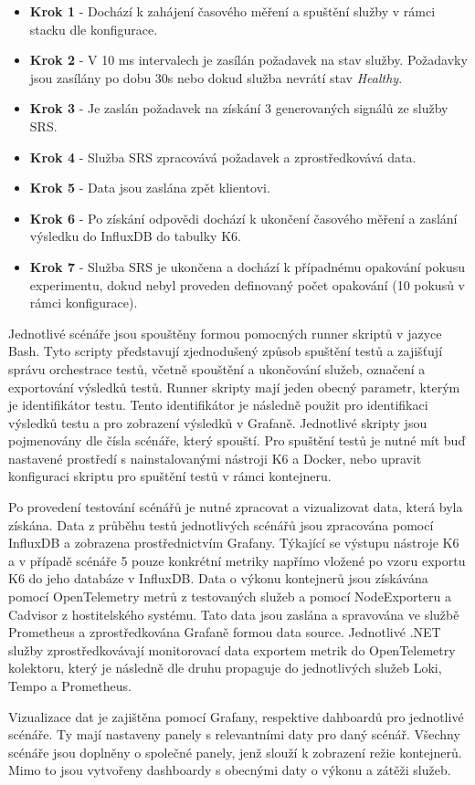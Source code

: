 \begin{itemize}
    \item \textbf{Krok 1} - Dochází k zahájení časového měření a spuštění služby v rámci stacku dle konfigurace.
    \item \textbf{Krok 2} - V 10 ms intervalech je zasílán požadavek na stav služby. Požadavky jsou zasílány po dobu 30s nebo dokud služba nevrátí stav \emph{Healthy}.
    \item \textbf{Krok 3} - Je zaslán požadavek na získání 3 generovaných signálů ze služby SRS.
    \item \textbf{Krok 4} - Služba SRS zpracovává požadavek a zprostředkovává data.
    \item \textbf{Krok 5} - Data jsou zaslána zpět klientovi.
    \item \textbf{Krok 6} - Po získání odpovědi dochází k ukončení časového měření a zaslání výsledku do InfluxDB do tabulky K6. 
    \item \textbf{Krok 7} - Služba SRS je ukončena a dochází k případnému opakování pokusu experimentu, dokud nebyl proveden definovaný počet opakování (10 pokusů v rámci konfigurace).
\end{itemize}


Jednotlivé scénáře jsou spouštěny formou pomocných runner skriptů v jazyce Bash. Tyto scripty představují zjednodušený způsob spuštění testů a zajišťují správu orchestrace testů, včetně spouštění a ukončování služeb, označení a exportování výsledků testů. Runner skripty mají jeden obecný parametr, kterým je identifikátor testu. Tento identifikátor je následně použit pro identifikaci výsledků testu a pro zobrazení výsledků v Grafaně. Jednotlivé skripty jsou pojmenovány dle čísla scénáře, který spouští. Pro spuštění testů je nutné mít buď nastavené prostředí s nainstalovanými nástroji K6 a Docker, nebo upravit konfiguraci skriptu pro spuštění testů v rámci kontejneru.


Po provedení testování scénářů je nutné zpracovat a vizualizovat data, která byla získána. Data z průběhu testů jednotlivých scénářů jsou zpracována pomocí InfluxDB a zobrazena prostřednictvím Grafany. Týkající se výstupu nástroje K6 a v případě scénáře 5 pouze konkrétní metriky napřímo vložené po vzoru exportu K6 do jeho databáze v InfluxDB. Data o výkonu kontejnerů jsou získávána pomocí OpenTelemetry metrů z testovaných služeb a pomocí NodeExporteru a Cadvisor z hostitelského systému. Tato data jsou zaslána a spravována ve službě Prometheus a zprostředkována Grafaně formou data source. Jednotlivé .NET služby zprostředkovávají monitorovací data exportem metrik do OpenTelemetry kolektoru, který je následně dle druhu propaguje do jednotlivých služeb Loki, Tempo a Prometheus.

Vizualizace dat je zajištěna pomocí Grafany, respektive dahboardů pro jednotlivé scénáře. Ty mají nastaveny panely s relevantními daty pro daný scénář. Všechny scénáře jsou doplněny o společné panely, jenž slouží k zobrazení režie kontejnerů. Mimo to jsou vytvořeny dashboardy s obecnými daty o výkonu a zátěži služeb.
